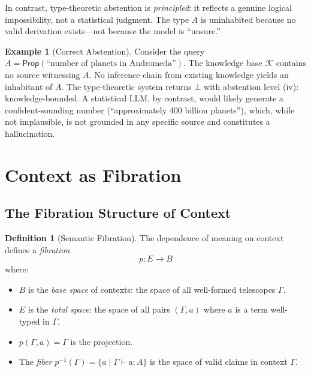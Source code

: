 \documentclass[11pt,a4paper]{article}
\theoremstyle{plain}
\theoremstyle{definition}
\newtheorem{definition}[theorem]{Definition}
\newtheorem{example}[theorem]{Example}
\theoremstyle{remark}
\begin{document}
In contrast, type-theoretic abstention is \emph{principled}: it reflects a genuine logical impossibility, not a statistical judgment.
The type $A$ is uninhabited because no valid derivation exists---not because the model is ``unsure.''

\begin{example}[Correct Abstention]\label{ex:abstention}
Consider the query $A = \mathsf{Prop}(\text{``number of planets in Andromeda''})$.
The knowledge base $\mathcal{K}$ contains no source witnessing $A$.
No inference chain from existing knowledge yields an inhabitant of $A$.
The type-theoretic system returns $\bot$ with abstention level (iv): knowledge-bounded.
A statistical LLM, by contrast, would likely generate a confident-sounding number (``approximately 400 billion planets''), which, while not implausible, is not grounded in any specific source and constitutes a hallucination.
\end{example}


\section{Context as Fibration}\label{sec:fibration}

\subsection{The Fibration Structure of Context}

\begin{definition}[Semantic Fibration]\label{def:fibration}
The dependence of meaning on context defines a \emph{fibration}
\[
  p : E \to B
\]
where:
\begin{itemize}[nosep]
  \item $B$ is the \emph{base space} of contexts: the space of all well-formed telescopes $\Gamma$.
  \item $E$ is the \emph{total space}: the space of all pairs $(\Gamma, a)$ where $a$ is a term well-typed in $\Gamma$.
  \item $p(\Gamma, a) = \Gamma$ is the projection.
  \item The \emph{fiber} $p^{-1}(\Gamma) = \{a \mid \Gamma \vdash a : A\}$ is the space of valid claims in context $\Gamma$.
\end{itemize}
\end{definition}
\end{document}

